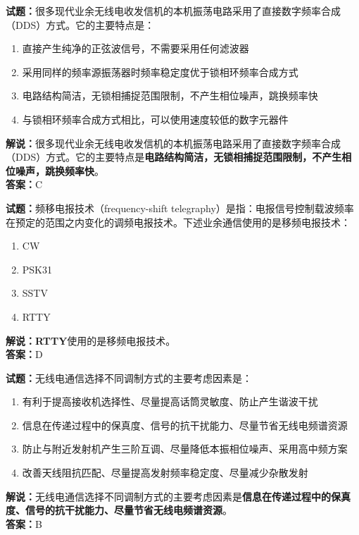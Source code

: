 \documentclass{ctexbook}
\begin{document}

\vspace{1em}

\textbf{试题：}很多现代业余无线电收发信机的本机振荡电路采用了直接数字频率合成（DDS）方式。它的主要特点是：
\begin{enumerate}[leftmargin=3em]
  \item 直接产生纯净的正弦波信号，不需要采用任何滤波器
  \item 采用同样的频率源振荡器时频率稳定度优于锁相环频率合成方式
  \item 电路结构简洁，无锁相捕捉范围限制，不产生相位噪声，跳换频率快
  \item 与锁相环频率合成方式相比，可以使用速度较低的数字元器件
\end{enumerate}
\noindent\textbf{解说：}很多现代业余无线电收发信机的本机振荡电路采用了直接数字频率合成（DDS）方式。它的主要特点是\textbf{电路结构简洁，无锁相捕捉范围限制，不产生相位噪声，跳换频率快}。\\\noindent\textbf{答案：}C


\vspace{1em}

\textbf{试题：}频移电报技术（frequency-shift telegraphy）是指：电报信号控制载波频率在预定的范围之内变化的调频电报技术。下述业余通信使用的是移频电报技术：
\begin{enumerate}[leftmargin=3em]
  \item CW
  \item PSK31
  \item SSTV
  \item RTTY
\end{enumerate}
\noindent\textbf{解说：}\textbf{RTTY}使用的是移频电报技术。\\\noindent\textbf{答案：}D

\vspace{1em}

\textbf{试题：}无线电通信选择不同调制方式的主要考虑因素是：
\begin{enumerate}[leftmargin=3em]
  \item 有利于提高接收机选择性、尽量提高话筒灵敏度、防止产生谐波干扰
  \item 信息在传递过程中的保真度、信号的抗干扰能力、尽量节省无线电频谱资源
  \item 防止与附近发射机产生三阶互调、尽量降低本振相位噪声、采用高中频方案
  \item 改善天线阻抗匹配、尽量提高发射频率稳定度、尽量减少杂散发射
\end{enumerate}
\noindent\textbf{解说：}无线电通信选择不同调制方式的主要考虑因素是\textbf{信息在传递过程中的保真度、信号的抗干扰能力、尽量节省无线电频谱资源}。\\\noindent\textbf{答案：}B
\end{document}

